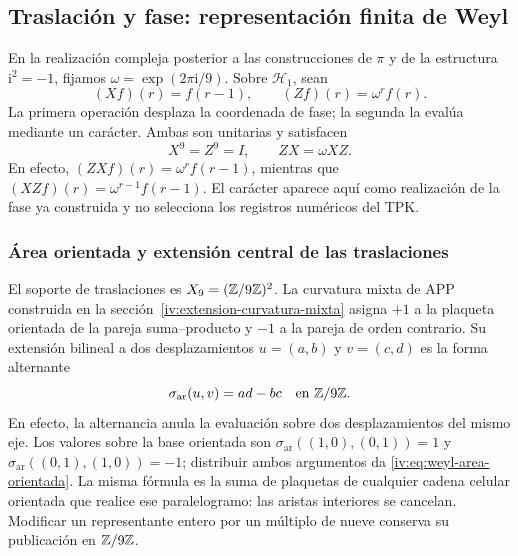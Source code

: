 \subsection{Traslación y fase: representación finita de Weyl}

En la realización compleja posterior a las construcciones de
\(\pi\) y de la estructura \(\mathrm i^2=-1\), fijamos
\(\omega=\exp(2\pi\mathrm i/9)\). Sobre \(\mathcal H_1\), sean
\begin{equation}
 (Xf)(r)=f(r-1),\qquad (Zf)(r)=\omega^r f(r).
 \label{iv:eq:weyl-operadores}
\end{equation}
La primera operación desplaza la coordenada de fase; la segunda la
evalúa mediante un carácter. Ambas son unitarias y satisfacen
\begin{equation}
 X^9=Z^9=I,\qquad ZX=\omega XZ.
 \label{iv:eq:weyl-relacion}
\end{equation}
En efecto, \((ZXf)(r)=\omega^r f(r-1)\), mientras que
\((XZf)(r)=\omega^{r-1}f(r-1)\). El carácter aparece aquí como
realización de la fase ya construida y no selecciona los registros
numéricos del TPK.

\subsubsection{Área orientada y extensión central de las traslaciones}
\label{iv:weyl-area-extension}

El soporte de traslaciones es \(X_9=(\mathbb Z/9\mathbb Z)^2\).
La curvatura mixta de APP construida en la
sección~\ref{iv:extension-curvatura-mixta} asigna \(+1\) a la
plaqueta orientada de la pareja suma--producto y \(-1\) a la
pareja de orden contrario. Su extensión bilineal a dos desplazamientos
\(u=(a,b)\) y \(v=(c,d)\) es la forma alternante
\begin{equation}
 \sigma_{\mathrm{ar}}(u,v)=ad-bc\quad\text{en }\mathbb Z/9\mathbb Z.
 \label{iv:eq:weyl-area-orientada}
\end{equation}
En efecto, la alternancia anula la evaluación sobre dos desplazamientos
del mismo eje. Los valores sobre la base orientada son
\(\sigma_{\mathrm{ar}}((1,0),(0,1))=1\) y
\(\sigma_{\mathrm{ar}}((0,1),(1,0))=-1\); distribuir ambos
argumentos da \eqref{iv:eq:weyl-area-orientada}. La misma fórmula es
la suma de plaquetas de cualquier cadena celular orientada que realice
ese paralelogramo: las aristas interiores se cancelan. Modificar un
representante entero por un múltiplo de nueve conserva su publicación
en \(\mathbb Z/9\mathbb Z\).

